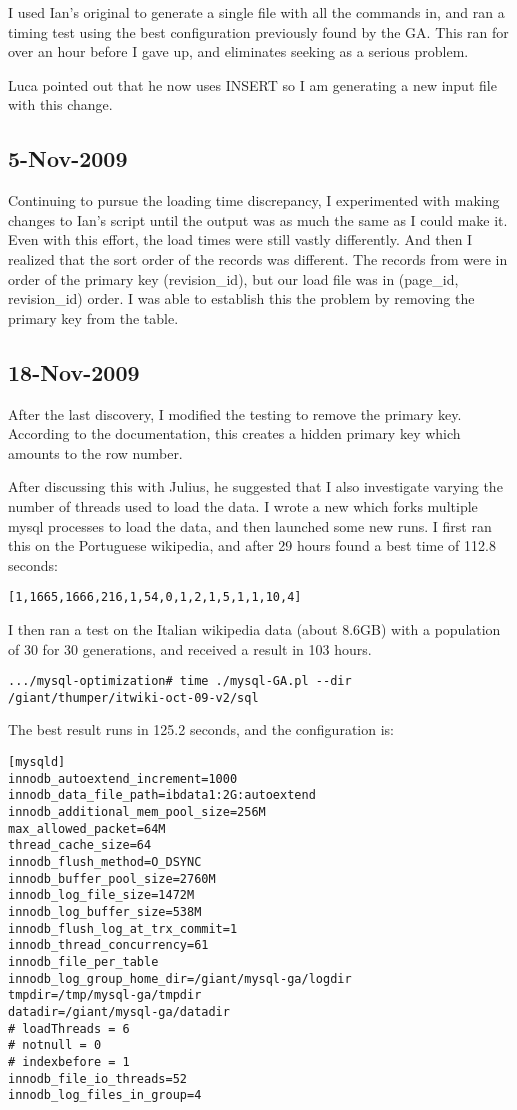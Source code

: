 I used Ian's original  to generate a single file with all the commands in,
and ran a timing test using the best configuration previously found by the GA.
This ran for over an hour before I gave up, and eliminates seeking as a serious problem.

Luca pointed out that he now uses INSERT so I am generating a new input file with this change.

\subsection{5-Nov-2009}

Continuing to pursue the loading time discrepancy, I experimented with making changes to Ian's
 script until the output was as much the same as I could make it.
Even with this effort, the load times were still vastly differently.
And then I realized that the sort order of the records was different.
The records from  were in order of the primary key (revision\_id),
but our load file was in (page\_id, revision\_id) order.
I was able to establish this the problem by removing the primary key from the table.

\subsection{18-Nov-2009}

After the last discovery, I modified the testing to remove the primary key.
According to the \mysql documentation, this creates a hidden primary key which
amounts to the row number.

After discussing this with Julius, he suggested that I also investigate varying
the number of threads used to load the data.
I wrote a new  which forks multiple mysql processes to
load the data, and then launched some new runs.
I first ran this on the Portuguese wikipedia, and after 29 hours found a best time of
112.8 seconds:
\begin{verbatim}
[1,1665,1666,216,1,54,0,1,2,1,5,1,1,10,4]
\end{verbatim}

I then ran a test on the Italian wikipedia data (about 8.6GB) with a population of 30 for 30 generations,
and received a result in 103 hours.
\begin{verbatim}
.../mysql-optimization# time ./mysql-GA.pl --dir /giant/thumper/itwiki-oct-09-v2/sql
\end{verbatim}
The best result runs in 125.2 seconds, and the configuration is:
\begin{verbatim}
[mysqld]
innodb_autoextend_increment=1000
innodb_data_file_path=ibdata1:2G:autoextend
innodb_additional_mem_pool_size=256M
max_allowed_packet=64M
thread_cache_size=64
innodb_flush_method=O_DSYNC
innodb_buffer_pool_size=2760M
innodb_log_file_size=1472M
innodb_log_buffer_size=538M
innodb_flush_log_at_trx_commit=1
innodb_thread_concurrency=61
innodb_file_per_table
innodb_log_group_home_dir=/giant/mysql-ga/logdir
tmpdir=/tmp/mysql-ga/tmpdir
datadir=/giant/mysql-ga/datadir
# loadThreads = 6
# notnull = 0
# indexbefore = 1
innodb_file_io_threads=52
innodb_log_files_in_group=4
\end{verbatim}

